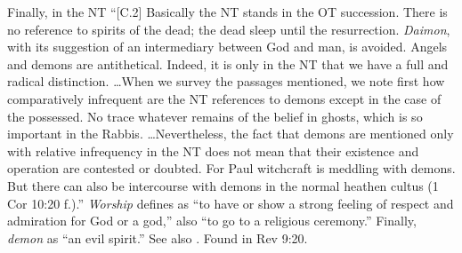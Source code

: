 Finally, in the NT ``[C.2] Basically the NT stands in the OT succession. There is no reference to spirits of the dead; the dead sleep until the resurrection. \emph{Daimon}, with its suggestion of an intermediary between God and man, is avoided. Angels and demons are antithetical. Indeed, it is only in the NT that we have a full and radical distinction. \ldots When we survey the passages mentioned, we note first how comparatively infrequent are the NT references to demons except in the case of the possessed. No trace whatever remains of the belief in ghosts, which is so important in the Rabbis. \ldots Nevertheless, the fact that demons are mentioned only with relative infrequency in the NT does not mean that their existence and operation are contested or doubted. For Paul witchcraft is meddling with demons. But there can also be intercourse with demons in the normal heathen cultus (1 Cor 10:20 f.).''
\emph{Worship} defines as ``to have or show a strong feeling of respect and admiration for God or a god,'' also ``to go to a religious ceremony.'' Finally, \emph{demon} as ``an evil spirit.'' See also .
Found in Rev 9:20.
